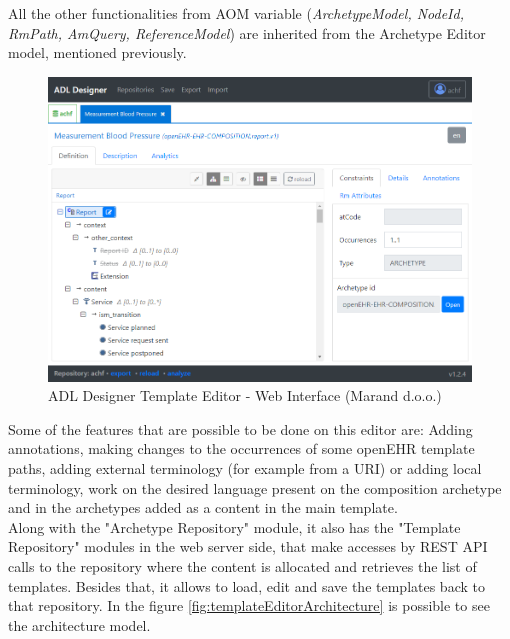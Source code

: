 \documentclass[mim_thesis.tex]{subfiles}
\begin{document}
All the other functionalities from AOM variable (\textit{ArchetypeModel, NodeId, RmPath, AmQuery, ReferenceModel}) are inherited from the Archetype Editor model, mentioned previously.

\begin{figure}[H]
	\centering
    \includegraphics[width=1\textwidth]{img/template_editor_adldesigner.PNG}
	\caption{ADL Designer Template Editor - Web Interface (Marand d.o.o.)}
	\label{fig:templateEditor}
\end{figure}

Some of the features that are possible to be done on this editor are: Adding annotations, making changes to the occurrences of some openEHR template paths, adding external terminology (for example from a URI) or adding local terminology, work on the desired language present on the composition archetype and in the archetypes added as a content in the main template.\\

Along with the "Archetype Repository" module, it also has the "Template Repository" modules in the web server side, that make accesses by REST API calls to the repository where the content is allocated and retrieves the list of templates. Besides that, it allows to load, edit and save the templates back to that repository. In the figure \ref{fig:templateEditorArchitecture} is possible to see the architecture model. 
\end{document}
